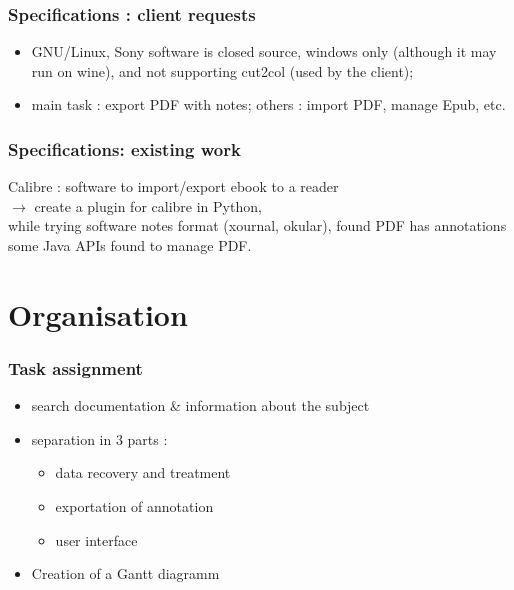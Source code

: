 \documentclass[t,12pt]{beamer}
\begin{document}
\begin{frame}
  \frametitle{Specifications : client requests}
  \begin{itemize}
    \item GNU/Linux,
    \pause Sony software is closed source, windows only (although
    it may run on wine), and not supporting cut2col (used by the
    client);
    \pause \item main task : export PDF with notes; \pause others :
    import PDF, manage Epub, etc.
  \end{itemize}
\end{frame}

\begin{frame}
  \frametitle{Specifications: existing work}
  Calibre : software to import/export ebook to a reader\\
  $\rightarrow$ create a plugin for calibre in Python,\\
  \pause while trying software notes format (xournal, okular),
  found PDF has annotations\\
  \pause some Java APIs found to manage PDF.
\end{frame}

\section{Organisation}
\begin{frame}
  \frametitle{Task assignment}
  \begin{itemize}
  	\item search documentation & information about the subject
	\pause \item separation in 3 parts :
	\begin{itemize}
		\pause \item data recovery and treatment
		\item exportation of annotation
		\item user interface
	\end{itemize}
	\pause \item Creation of a Gantt diagramm
  \end{itemize}
\end{frame}
\end{document}
